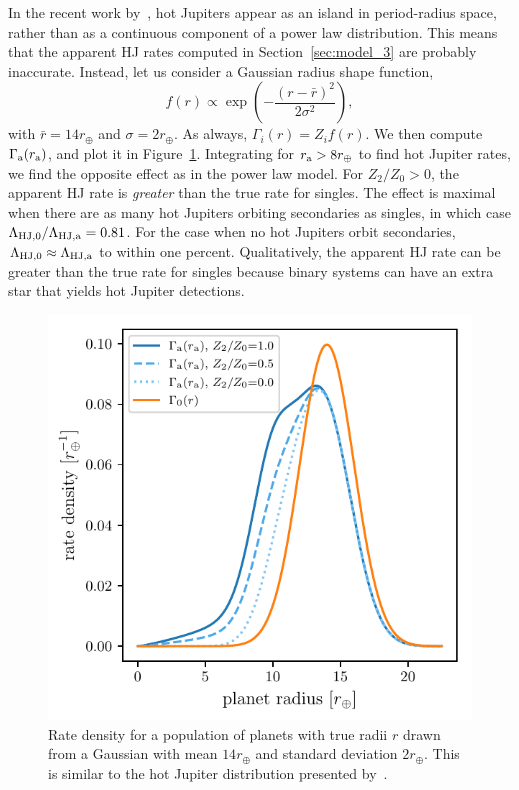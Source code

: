 \documentclass[12pt,modern]{aastex61}
\renewcommand{\a}{_{\rm a}}
\begin{document}
In the recent work by~\citet{petigura_CKS_2017}, hot Jupiters appear as an 
island in period-radius space, rather than as a continuous component of a 
power law distribution.
This means that the apparent HJ rates computed in 
Section~\ref{sec:model_3} are probably inaccurate.
Instead, let us consider a Gaussian radius shape function,
\begin{equation}
f(r) \propto \exp \left( -\frac{(r-\bar{r})^2}{2\sigma^2} \right),
\end{equation}
with $\bar{r} = 14r_\oplus$ and $\sigma = 2r_\oplus$.
As always, $\Gamma_i(r) = Z_i f(r)$.
We then compute $\Gamma\a(r\a)$, and plot it in Figure~\ref{fig:gaussian_HJ}.
Integrating for $r\a > 8r_\oplus$ to find hot Jupiter rates,
we find the opposite effect as in the power law model.
For $Z_2/Z_0>0$, 
the apparent HJ rate is {\it greater} than the true rate for singles.
The effect is maximal when there are as many hot Jupiters orbiting secondaries 
as singles, in which case
$\Lambda_{{\rm HJ},0}/\Lambda_{\rm HJ,a} = 0.81$.
For the case when no hot Jupiters orbit secondaries, $\Lambda_{{\rm HJ},0} 
\approx \Lambda_{\rm HJ,a}$ to within one percent.
Qualitatively, the apparent HJ rate can be greater than the true rate for 
singles because binary systems can have an extra star that yields 
hot Jupiter detections.


\begin{figure}[!tb]
    \centering
    \includegraphics[width=.6\textwidth]{figures/int_rate_density_vs_radius_model_7_rpu_22.5_manyZs.pdf}
    \caption{
        Rate density for a population of planets with true radii $r$ drawn from
        a Gaussian with mean $14r_\oplus$ and standard deviation $2r_\oplus$.
        This is similar to the hot Jupiter distribution presented 
        by~\citet{petigura_CKS_2017}.
    }
    \label{fig:gaussian_HJ}
\end{figure}
\end{document}

